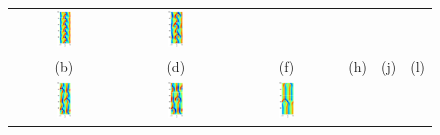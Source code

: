 \begin{figure}[t]
\begin{center}
\begin{tabular}{cccccc}
\includegraphics[width=0.15\textwidth]{figs/ks22rpo020.5-00.00.eps}\hspace{-3ex} &
\includegraphics[width=0.15\textwidth]{figs/ks22rpo066.8-00.00.eps}\\
(b) & (d) & (f) & (h) & (j) & (l)\\
\includegraphics[width=0.15\textwidth]{figs/ks22rpo032.8-10.96.eps}\hspace{-3ex} &
\includegraphics[width=0.15\textwidth]{figs/ks22rpo034.6-09.60.eps}\hspace{-3ex} &
\includegraphics[width=0.15\textwidth]{figs/ks22rpo059.9-05.44.eps}\hspace{-3ex} &

\end{tabular}
\end{center}
\end{figure}
